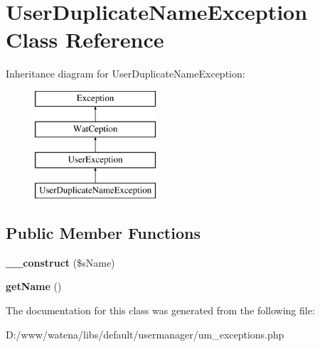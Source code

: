\hypertarget{class_user_duplicate_name_exception}{\section{User\-Duplicate\-Name\-Exception Class Reference}
\label{class_user_duplicate_name_exception}
}
Inheritance diagram for User\-Duplicate\-Name\-Exception\-:\begin{figure}[H]
\begin{center}
\leavevmode
\includegraphics[height=4.000000cm]{class_user_duplicate_name_exception}
\end{center}
\end{figure}
\subsection*{Public Member Functions}
\begin{DoxyCompactItemize}
\item 
\hypertarget{class_user_duplicate_name_exception_a293b82f442f412b49ee43d93b95c1b8c}{{\bfseries \-\_\-\-\_\-construct} (\$s\-Name)}\label{class_user_duplicate_name_exception_a293b82f442f412b49ee43d93b95c1b8c}

\item 
\hypertarget{class_user_duplicate_name_exception_a23edd022027e0d04b0f9804073f47d83}{{\bfseries get\-Name} ()}\label{class_user_duplicate_name_exception_a23edd022027e0d04b0f9804073f47d83}

\end{DoxyCompactItemize}


The documentation for this class was generated from the following file\-:\begin{DoxyCompactItemize}
\item 
D\-:/www/watena/libs/default/usermanager/um\-\_\-exceptions.\-php\end{DoxyCompactItemize}
